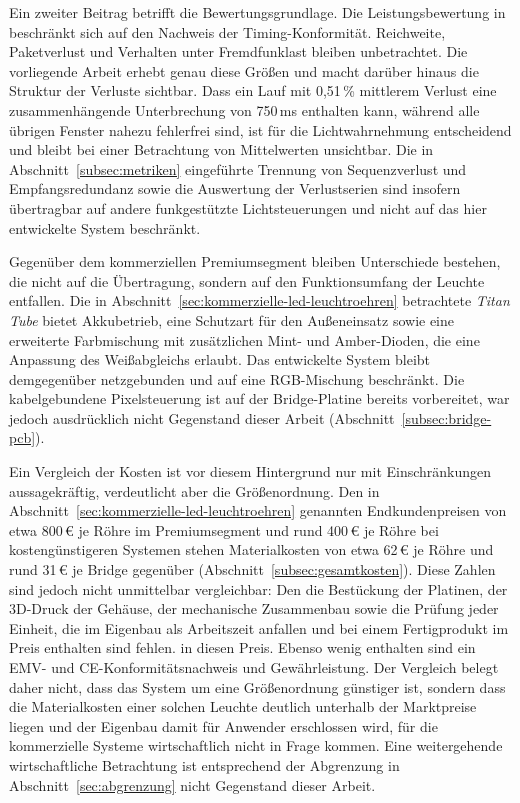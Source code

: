 Ein zweiter Beitrag betrifft die Bewertungsgrundlage. Die Leistungsbewertung in
\cite{yang2015real} beschränkt sich auf den Nachweis der Timing-Konformität.
Reichweite, Paketverlust und Verhalten unter Fremdfunklast bleiben unbetrachtet.
Die vorliegende Arbeit erhebt genau diese Größen und macht darüber hinaus die
Struktur der Verluste sichtbar. Dass ein Lauf mit 0,51\,\% mittlerem Verlust eine
zusammenhängende Unterbrechung von 750\,ms enthalten kann, während alle übrigen
Fenster nahezu fehlerfrei sind, ist für die Lichtwahrnehmung entscheidend und
bleibt bei einer Betrachtung von Mittelwerten unsichtbar. Die in
Abschnitt~\ref{subsec:metriken} eingeführte Trennung von Sequenzverlust und
Empfangsredundanz sowie die Auswertung der Verlustserien sind insofern
übertragbar auf andere funkgestützte Lichtsteuerungen und nicht auf das hier
entwickelte System beschränkt.

Gegenüber dem kommerziellen Premiumsegment bleiben Unterschiede bestehen, die
nicht auf die Übertragung, sondern auf den Funktionsumfang der Leuchte entfallen.
Die in Abschnitt~\ref{sec:kommerzielle-led-leuchtroehren} betrachtete
\textit{Titan Tube} bietet Akkubetrieb, eine Schutzart für den Außeneinsatz sowie
eine erweiterte Farbmischung mit zusätzlichen Mint- und Amber-Dioden, die eine
Anpassung des Weißabgleichs erlaubt. Das entwickelte System bleibt demgegenüber
netzgebunden und auf eine RGB-Mischung beschränkt. Die kabelgebundene
Pixelsteuerung ist auf der Bridge-Platine bereits vorbereitet, war jedoch
ausdrücklich nicht Gegenstand dieser Arbeit
(Abschnitt~\ref{subsec:bridge-pcb}).

Ein Vergleich der Kosten ist vor diesem Hintergrund nur mit Einschränkungen
aussagekräftig, verdeutlicht aber die Größenordnung. Den in
Abschnitt~\ref{sec:kommerzielle-led-leuchtroehren} genannten Endkundenpreisen von
etwa 800\,€ je Röhre im Premiumsegment und rund 400\,€ je Röhre bei
kostengünstigeren Systemen stehen Materialkosten von etwa 62\,€ je Röhre und rund
31\,€ je Bridge gegenüber (Abschnitt~\ref{subsec:gesamtkosten}). Diese Zahlen sind
jedoch nicht unmittelbar vergleichbar: Den die Bestückung
der Platinen, der 3D-Druck der Gehäuse, der mechanische Zusammenbau sowie die
Prüfung jeder Einheit, die im Eigenbau als Arbeitszeit anfallen und bei einem
Fertigprodukt im Preis enthalten sind fehlen. in diesen Preis. Ebenso wenig enthalten sind ein
EMV- und CE-Konformitätsnachweis und Gewährleistung.
Der Vergleich belegt daher nicht, dass das System um eine Größenordnung
günstiger ist, sondern dass die Materialkosten einer solchen Leuchte
deutlich unterhalb der Marktpreise liegen und der Eigenbau damit für Anwender
erschlossen wird, für die kommerzielle Systeme wirtschaftlich nicht in Frage
kommen. Eine weitergehende wirtschaftliche Betrachtung ist entsprechend der
Abgrenzung in Abschnitt~\ref{sec:abgrenzung} nicht Gegenstand dieser Arbeit.

